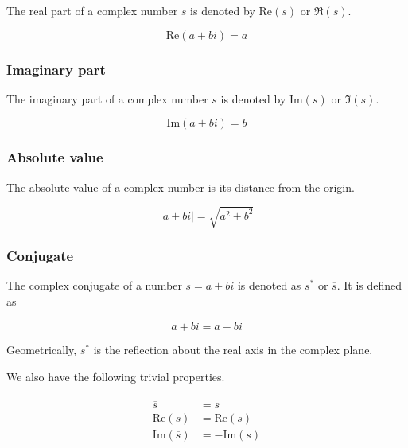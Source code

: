 \documentclass{article}
\begin{document}
The real part of a complex number \(s\) is denoted by \(\text{Re}(s)\) or \(\Re(s)\).

\[
    \text{Re}(a+bi) = a
\]

\subsubsection{Imaginary part}

The imaginary part of a complex number \(s\) is denoted by \(\text{Im}(s)\) or \(\Im(s)\).

\[
    \text{Im}(a+bi) = b
\]

\subsubsection{Absolute value}

The absolute value of a complex number is its distance from the origin.

\[
    |a+bi| = \sqrt{a^2 + b^2}
\]

\subsubsection{Conjugate}

The complex conjugate of a number \(s=a+bi\) is denoted as \(s^*\) or \(\overline{s}\).
It is defined as

\[
    \overline{a+bi} = a-bi
\]

Geometrically, \(s^*\) is the reflection about the real axis in the complex plane.

We also have the following trivial properties.

\begin{align*}
    \overline{\overline{s}} &= s
    \\
    \text{Re}(\overline{s}) &= \text{Re}(s)
    \\
    \text{Im}(\overline{s}) &= -\text{Im}(s)
\end{align*}

\pagebreak
\end{document}
